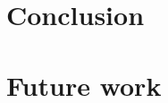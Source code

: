 \documentclass[conference]{IEEEtran}
\begin{document}





	\noindent


	\section{Conclusion}




	\section{Future work}
\end{document}
